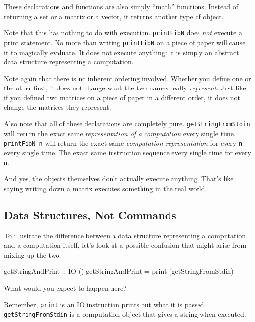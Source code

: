 \documentclass[]{article}
\newenvironment{Shaded}{}{}
\newcommand{\DataTypeTok}[1]{\textcolor[rgb]{0.56,0.13,0.00}{{#1}}}
\newcommand{\OtherTok}[1]{\textcolor[rgb]{0.00,0.44,0.13}{{#1}}}
\newcommand{\FunctionTok}[1]{\textcolor[rgb]{0.02,0.16,0.49}{{#1}}}
\newcommand{\NormalTok}[1]{{#1}}
\begin{document}
These declarations and functions are also simply ``math'' functions.
Instead of returning a set or a matrix or a vector, it returns another
type of object.

Note that this has nothing to do with execution. \texttt{printFibN} does
\emph{not} execute a print statement. No more than writing
\texttt{printFibN} on a piece of paper will cause it to magically
evaluate. It does not execute anything: it is simply an abstract data
structure representing a computation.

Note again that there is no inherent ordering involved. Whether you
define one or the other first, it does not change what the two names
really \emph{represent}. Just like if you defined two matrices on a
piece of paper in a different order, it does not change the matrices
they represent.

Also note that all of these declarations are completely pure.
\texttt{getStringFromStdin} will return the exact same
\emph{representation of a computation} every single time.
\texttt{printFibN\ n} will return the exact same \emph{computation
representation} for every \texttt{n} every single time. The exact same
instruction sequence every single time for every \texttt{n}.

And yes, the objects themselves don't actually execute anything. That's
like saying writing down a matrix executes something in the real world.

\subsection{Data Structures, Not
Commands}\label{data-structures-not-commands}

To illustrate the difference between a data structure representing a
computation and a computation itself, let's look at a possible confusion
that might arise from mixing up the two.

\begin{Shaded}
\begin{Highlighting}[]
\OtherTok{getStringAndPrint ::} \DataTypeTok{IO} \NormalTok{()}
\NormalTok{getStringAndPrint }\FunctionTok{=} \NormalTok{print (getStringFromStdin)}
\end{Highlighting}
\end{Shaded}

What would you expect to happen here?

Remember, \texttt{print} is an IO instruction prints out what it is
passed. \texttt{getStringFromStdin} is a computation object that gives a
string when executed.
\end{document}
